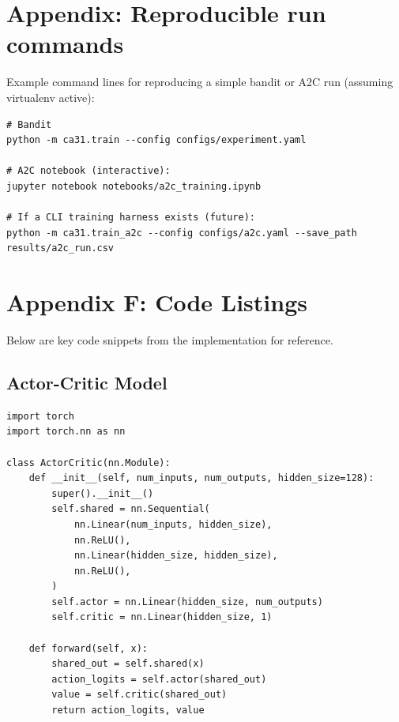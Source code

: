 \documentclass[11pt]{article}
\begin{document}
\section{Appendix: Reproducible run commands}
Example command lines for reproducing a simple bandit or A2C run (assuming virtualenv active):
\begin{verbatim}
# Bandit
python -m ca31.train --config configs/experiment.yaml

# A2C notebook (interactive):
jupyter notebook notebooks/a2c_training.ipynb

# If a CLI training harness exists (future):
python -m ca31.train_a2c --config configs/a2c.yaml --save_path results/a2c_run.csv
\end{verbatim}

\section{Appendix F: Code Listings}
Below are key code snippets from the implementation for reference.

\subsection{Actor-Critic Model}
\begin{lstlisting}[caption=Actor-Critic neural network model]
import torch
import torch.nn as nn

class ActorCritic(nn.Module):
    def __init__(self, num_inputs, num_outputs, hidden_size=128):
        super().__init__()
        self.shared = nn.Sequential(
            nn.Linear(num_inputs, hidden_size),
            nn.ReLU(),
            nn.Linear(hidden_size, hidden_size),
            nn.ReLU(),
        )
        self.actor = nn.Linear(hidden_size, num_outputs)
        self.critic = nn.Linear(hidden_size, 1)

    def forward(self, x):
        shared_out = self.shared(x)
        action_logits = self.actor(shared_out)
        value = self.critic(shared_out)
        return action_logits, value
\end{lstlisting}
\end{document}
